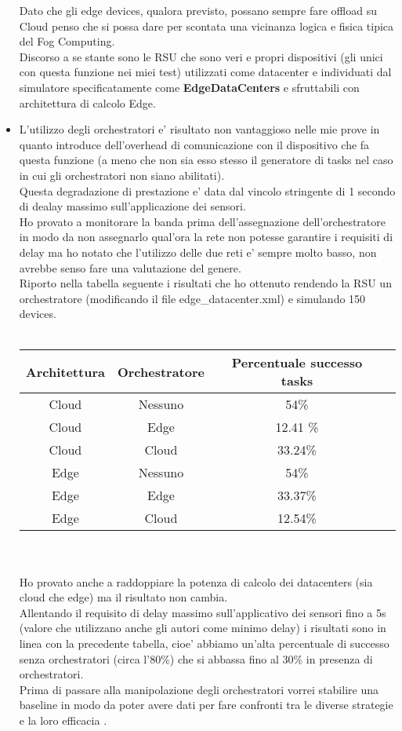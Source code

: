 \documentclass[12pt, a4paper]{report} %
\begin{document}
\begin{itemize}
 	Dato che gli edge devices, qualora previsto, possano sempre fare offload su Cloud penso che si possa dare per scontata una vicinanza logica e fisica tipica del Fog Computing.\\
 	Discorso a se stante sono le RSU che sono veri e propri dispositivi (gli unici con questa funzione nei miei test) utilizzati come datacenter e individuati dal simulatore specificatamente come \textbf{EdgeDataCenters} e sfruttabili con architettura di calcolo Edge.
 	\item L'utilizzo degli orchestratori e' risultato non vantaggioso nelle mie prove in quanto introduce dell'overhead di comunicazione con il dispositivo che fa questa funzione (a meno che non sia esso stesso il generatore di tasks nel caso in cui gli orchestratori non siano abilitati).\\
	Questa degradazione di prestazione e' data dal vincolo stringente di 1 secondo di dealay massimo sull'applicazione dei sensori.\\
	Ho provato a monitorare la banda prima dell'assegnazione dell'orchestratore in modo da non assegnarlo qual'ora la rete non potesse garantire i requisiti di delay ma ho notato che l'utilizzo delle due reti e' sempre molto basso, non avrebbe senso fare una valutazione del genere.\\
	Riporto nella tabella seguente i risultati che ho ottenuto rendendo la RSU un orchestratore (modificando il file edge\_datacenter.xml) e simulando 150 devices.\\
	\\
 	\begin{tabular}{| c | c | c || c ||} %
		\hline
		Architettura & Orchestratore & Percentuale successo tasks\\ [1ex] 
		\hline
		\hline
		Cloud & Nessuno & 54\%\\
		\hline
		Cloud & Edge & 12.41 \%\\
		\hline
		Cloud & Cloud & 33.24\%\\
		\hline
		Edge & Nessuno & 54\%\\
		\hline
		Edge & Edge & 33.37\%\\
		\hline
		Edge & Cloud & 12.54\%\\
		\hline
\end{tabular}
	\\
	\\
	Ho provato anche a raddoppiare la potenza di calcolo dei datacenters (sia cloud che edge) ma il risultato non cambia.
	\\
	Allentando il requisito di delay massimo sull'applicativo dei sensori fino a 5s (valore che utilizzano anche gli autori come minimo delay) i risultati sono in linea con la precedente tabella, cioe' abbiamo un'alta percentuale di successo senza orchestratori (circa l'80\%) che si abbassa fino al 30\% in presenza di orchestratori.\\
Prima di passare alla manipolazione degli orchestratori vorrei stabilire una baseline in modo da poter avere dati per fare confronti tra le diverse strategie e la loro efficacia .

\end{itemize}
\end{document}
